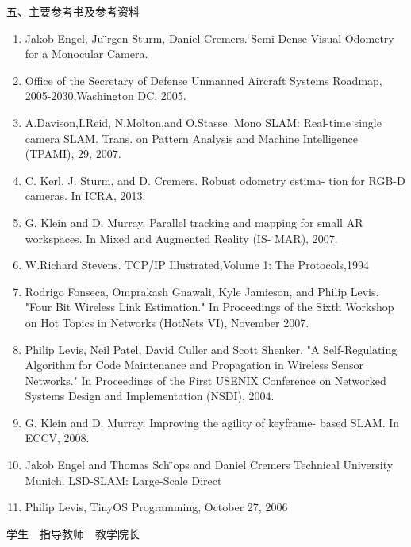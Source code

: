 {\noindent\sihao\hei 五、主要参考书及参考资料}
\begin{enumerate}  \setlength{\itemsep}{-5pt}
\vspace{-5pt}
\item Jakob Engel, Ju ̈rgen Sturm, Daniel Cremers. Semi-Dense Visual Odometry for a Monocular Camera.
\item Office of the Secretary of Defense Unmanned Aircraft Systems Roadmap, 2005-2030,Washington DC, 2005.  
\item A.Davison,I.Reid, N.Molton,and O.Stasse. Mono SLAM: Real-time single camera SLAM. Trans. on Pattern Analysis and Machine Intelligence (TPAMI), 29, 2007.
\item  C. Kerl, J. Sturm, and D. Cremers. Robust odometry estima- tion for RGB-D cameras. In ICRA, 2013.
\item G. Klein and D. Murray. Parallel tracking and mapping for small AR workspaces. In Mixed and Augmented Reality (IS- MAR), 2007.
\item W.Richard Stevens. TCP/IP Illustrated,Volume 1: The Protocols,1994
\item Rodrigo Fonseca, Omprakash Gnawali, Kyle Jamieson, and Philip Levis. "Four Bit Wireless Link Estimation." In Proceedings of the Sixth Workshop on Hot Topics in Networks (HotNets VI), November 2007.
\item Philip Levis, Neil Patel, David Culler and Scott Shenker. "A Self-Regulating Algorithm for Code Maintenance and Propagation in Wireless Sensor Networks." In Proceedings of the First USENIX Conference on Networked Systems Design and Implementation (NSDI), 2004.
\item G. Klein and D. Murray. Improving the agility of keyframe- based SLAM. In ECCV, 2008.
\item Jakob Engel and Thomas Sch ̈ops and Daniel Cremers Technical University Munich. LSD-SLAM: Large-Scale Direct
\item Philip Levis, TinyOS Programming, October 27, 2006
\end{enumerate}
\vspace{1cm}
\begin{center}
\sihao\hei
\mbox{学生 \underline{\hspace{2.6cm}} \hspace{0.4cm} 指导教师 \underline{\hspace{2.6cm}} \hspace{0.4cm} 教学院长 \underline{\hspace{2.6cm}}}
\end{center}


